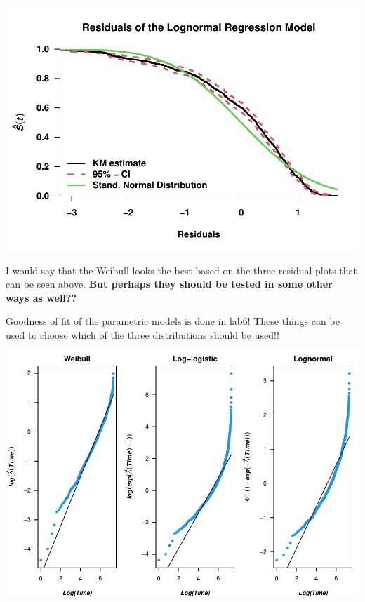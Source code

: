 \documentclass[
]{article}
\newenvironment{Shaded}{\begin{snugshade}}{\end{snugshade}}
\newcommand{\AttributeTok}[1]{\textcolor[rgb]{0.77,0.63,0.00}{#1}}
\newcommand{\CommentTok}[1]{\textcolor[rgb]{0.56,0.35,0.01}{\textit{#1}}}
\newcommand{\DecValTok}[1]{\textcolor[rgb]{0.00,0.00,0.81}{#1}}
\newcommand{\FunctionTok}[1]{\textcolor[rgb]{0.00,0.00,0.00}{#1}}
\newcommand{\NormalTok}[1]{#1}
\newcommand{\SpecialCharTok}[1]{\textcolor[rgb]{0.00,0.00,0.00}{#1}}
\newcommand{\StringTok}[1]{\textcolor[rgb]{0.31,0.60,0.02}{#1}}
\begin{document}
\includegraphics{practical_files/figure-latex/unnamed-chunk-13-3.pdf}

I would say that the Weibull looks the best based on the three residual plots that can be seen above. \textbf{But perhaps they should be tested in some other ways as well??}

Goodness of fit of the parametric models is done in lab6! These things can be used to choose which of the three distributions should be used!!

\begin{Shaded}
\end{Shaded}

\includegraphics{practical_files/figure-latex/unnamed-chunk-14-1.pdf}
\end{document}
